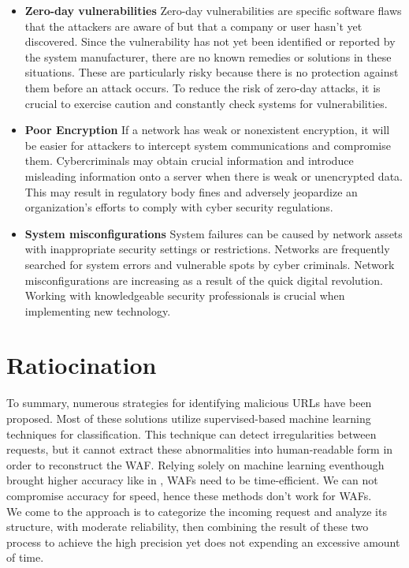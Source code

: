 \begin{itemize}
    \item \textbf{Zero-day vulnerabilities}
    Zero-day vulnerabilities are specific software flaws that the attackers are aware of but that a company or user hasn't yet discovered.
    Since the vulnerability has not yet been identified or reported by the system manufacturer, there are no known remedies or solutions in these situations. These are particularly risky because there is no protection against them before an attack occurs. To reduce the risk of zero-day attacks, it is crucial to exercise caution and constantly check systems for vulnerabilities.
    \item \textbf{Poor Encryption}
    If a network has weak or nonexistent encryption, it will be easier for attackers to intercept system communications and compromise them. Cybercriminals may obtain crucial information and introduce misleading information onto a server when there is weak or unencrypted data. This may result in regulatory body fines and adversely jeopardize an organization's efforts to comply with cyber security regulations.
    \item \textbf{System misconfigurations}
    System failures can be caused by network assets with inappropriate security settings or restrictions. Networks are frequently searched for system errors and vulnerable spots by cyber criminals. Network misconfigurations are increasing as a result of the quick digital revolution. Working with knowledgeable security professionals is crucial when implementing new technology.

\end{itemize}

\section{Ratiocination}
\label{ratio}
To summary, numerous strategies for identifying malicious URLs have been proposed. Most of these solutions utilize supervised-based machine learning techniques for classification. This technique can detect irregularities between requests, but it cannot extract these abnormalities into human-readable form in order to reconstruct the WAF. Relying solely on machine learning eventhough brought higher accuracy like in \cite{s22093373}, WAFs need to be time-efficient. We can not compromise accuracy for speed, hence these methods don't work for WAFs.\\
We come to the approach is to categorize the incoming request and analyze its structure, with moderate reliability, then combining the result of these two process to achieve the high precision yet does not expending an excessive amount of time.

